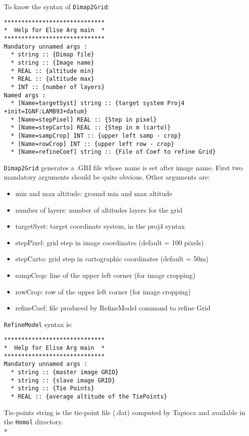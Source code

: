 To know the syntax of {\tt Dimap2Grid}:
\begin{verbatim}
*****************************
*  Help for Elise Arg main  *
*****************************
Mandatory unnamed args :
  * string :: {Dimap file}
  * string :: {Image name}
  * REAL :: {altitude min}
  * REAL :: {altitude max}
  * INT :: {number of layers}
Named args :
  * [Name=targetSyst] string :: {target system Proj4 +init=IGNF:LAMB93+datum}
  * [Name=stepPixel] REAL :: {Step in pixel}
  * [Name=stepCarto] REAL :: {Step in m (carto)}
  * [Name=sampCrop] INT :: {upper left samp - crop}
  * [Name=rowCrop] INT :: {upper left row - crop}
  * [Name=refineCoef] string :: {File of Coef to refine Grid}
\end{verbatim}

{\tt Dimap2Grid} generates a .GRI file whose name is set after image name.
First two mandatory arguments should be quite obvious. Other arguments are:
\begin{itemize}
\item min and max altitude: ground min and max altitude
\item number of layers: number of altitudes layers for the grid
\item targetSyst: target coordinate system, in the proj4 syntax
\item stepPixel: grid step in image coordinates (default = 100 pixels)
\item stepCarto: grid step in cartographic coordinates (default = 50m)
\item sampCrop: line of the upper left corner (for image cropping)
\item rowCrop: row of the upper left corner (for image cropping)
\item refineCoef: file produced by RefineModel command to refine Grid
\end{itemize}

{\tt RefineModel} syntax is:

\begin{verbatim}
*****************************
*  Help for Elise Arg main  *
*****************************
Mandatory unnamed args :
  * string :: {master image GRID}
  * string :: {slave image GRID}
  * string :: {Tie Points}
  * REAL :: {average altitude of the TiePoints}
\end{verbatim}

Tie-points string is the tie-point file (.dat) computed by Tapioca and available in the {\tt Homol} directory.\\*

